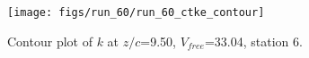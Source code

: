 \begin{figure}[H]
\centering
\texttt{[image: figs/run\_60/run\_60\_ctke\_contour]}
\caption{Contour plot of $k$ at $z/c$=9.50, $V_{free}$=33.04, station 6.}
\end{figure}


